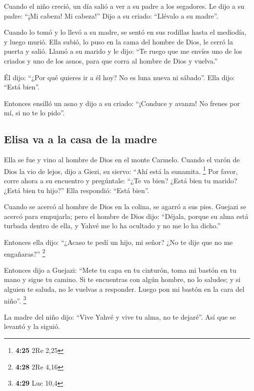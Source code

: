  Cuando el niño creció, un día salió a ver a su padre a
los segadores.  Le dijo a su padre: ``¡Mi cabeza! Mi
cabeza!'' Dijo a su criado: ``Llévalo a su madre''.

 Cuando lo tomó y lo llevó a su madre, se sentó en sus
rodillas hasta el mediodía, y luego murió.  Ella subió,
lo puso en la cama del hombre de Dios, le cerró la puerta y salió.
 Llamó a su marido y le dijo: ``Te ruego que me envíes
uno de los criados y uno de los asnos, para que corra al hombre de Dios
y vuelva.''

 Él dijo: ``¿Por qué quieres ir a él hoy? No es luna
nueva ni sábado''. Ella dijo: ``Está bien''.

 Entonces ensilló un asno y dijo a su criado: ``¡Conduce
y avanza! No frenes por mí, si no te lo pido''.

\hypertarget{elisa-va-a-la-casa-de-la-madre}{%
\subsection{Elisa va a la casa de la
madre}\label{elisa-va-a-la-casa-de-la-madre}}

 Ella se fue y vino al hombre de Dios en el monte
Carmelo. Cuando el varón de Dios la vio de lejos, dijo a Giezi, su
siervo: ``Ahí está la sunamita. \footnote{\textbf{4:25} 2Re 2,25}
 Por favor, corre ahora a su encuentro y pregúntale:
``¿Te va bien? ¿Está bien tu marido? ¿Está bien tu hijo?'' Ella
respondió: ``Está bien''.

 Cuando se acercó al hombre de Dios en la colina, se
agarró a sus pies. Guejazi se acercó para empujarla; pero el hombre de
Dios dijo: ``Déjala, porque su alma está turbada dentro de ella, y Yahvé
me lo ha ocultado y no me lo ha dicho.''

 Entonces ella dijo: ``¿Acaso te pedí un hijo, mi señor?
¿No te dije que no me engañaras?'' \footnote{\textbf{4:28} 2Re 4,16}

 Entonces dijo a Guejazi: ``Mete tu capa en tu cinturón,
toma mi bastón en tu mano y sigue tu camino. Si te encuentras con algún
hombre, no lo saludes; y si alguien te saluda, no le vuelvas a
responder. Luego pon mi bastón en la cara del niño''. \footnote{\textbf{4:29}
  Luc 10,4}

 La madre del niño dijo: ``Vive Yahvé y vive tu alma, no
te dejaré''. Así que se levantó y la siguió.

